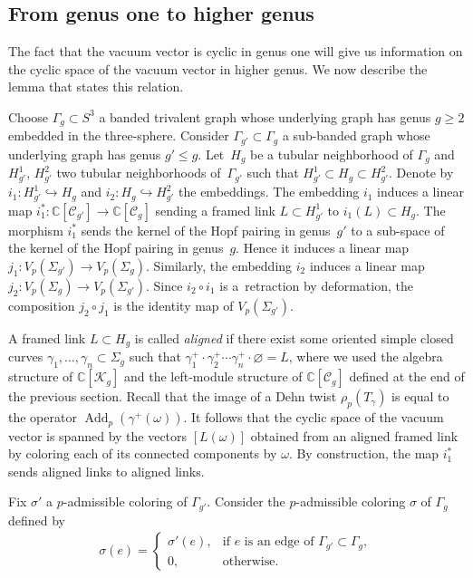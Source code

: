 \documentclass[11pt]{article}
\newcommand{\Add}{\operatorname{Add}}
\numberwithin{equation}{section}
\begin{document}
\subsection{From genus one to higher genus}

The fact that the vacuum vector is cyclic in genus one will give us information on the cyclic space of the vacuum vector in higher genus. We now describe the lemma that states this relation.

Choose $\Gamma_g \subset {S}^3$ a banded trivalent graph whose underlying graph has genus $g\geq 2$ embedded in the three-sphere. Consider $\Gamma_{g'}\subset \Gamma_g$ a sub-banded graph whose underlying graph has genus $g'\leq g$. Let~$H_g$ be a tubular neighborhood of $\Gamma_g$ and $H_{g'}^1$, $H_{g'}^2$ two tubular neighborhoods of~$\Gamma_{g'}$ such that $H_{g'}^1\subset H_g \subset H_{g'}^2$. Denote by $i_1\colon H_{g'}^1 \hookrightarrow H_g$ and $i_2\colon H_g \hookrightarrow H_{g'}^2$ the embeddings. The embedding $i_1$ induces a linear map $i_1^*\colon \mathbb{C}[\mathcal{C}_{g'}] \rightarrow \mathbb{C}[\mathcal{C}_g]$ sending a framed link $L\subset H_{g'}^1$ to $i_1(L) \subset H_g$. The morphism $i_1^*$ sends the kernel of the Hopf pairing in genus~$g'$ to a sub-space of the kernel of the Hopf pairing in genus~$g$. Hence it induces a linear map $j_1 \colon V_p(\Sigma_{g'}) \rightarrow V_p(\Sigma_g)$. Similarly, the embedding $i_2$ induces a linear map $j_2\colon V_p(\Sigma_g) \rightarrow V_p(\Sigma_{g'})$. Since $i_2 \circ i_1$ is a~retraction by deformation, the composition $j_2\circ j_1$ is the identity map of $V_p(\Sigma_{g'})$.

A framed link $L\subset H_g$ is called \textit{aligned} if there exist some oriented simple closed curves $\gamma_1, \ldots, \gamma_n\subset \Sigma_g$ such that $\gamma_1^+ \cdot \gamma_2^+ \cdots \gamma_n^+ \cdot \varnothing = L$, where we used the algebra structure of $\mathbb{C}[\mathcal{K}_g]$ and the left-module structure of $\mathbb{C}[\mathcal{C}_g]$ defined at the end of the previous section. Recall that the image of a Dehn twist $\rho_p(T_{\gamma})$ is equal to the operator $\Add_p(\gamma^+(\omega))$. It follows that the cyclic space of the vacuum vector is spanned by the vectors $[L(\omega)]$ obtained from an aligned framed link by coloring each of its connected components by $\omega$. By construction, the map $i_1^*$ sends aligned links to aligned links.

Fix $\sigma'$ a $p$-admissible coloring of $\Gamma_{g'}$. Consider the $p$-admissible coloring $\sigma$ of $\Gamma_g$ defined by
\begin{gather*} \sigma(e)= \begin{cases}
\sigma'(e), & \text{if $e$ is an edge of $\Gamma_{g'}\subset \Gamma_g$},\\
0, & \text{otherwise}.
\end{cases}\end{gather*}
\end{document}
